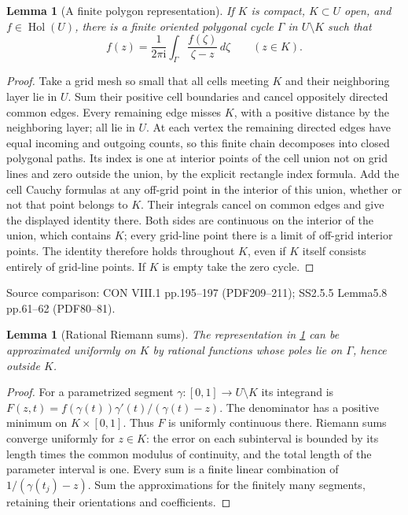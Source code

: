 \documentclass[11pt,a4paper,openany]{book}
\newtheorem{lemma}[theorem]{Lemma}
\theoremstyle{definition}
\theoremstyle{remark}\newtheorem{remark}[theorem]{Remark}
\newcommand{\dd}{\,d}\newcommand{\iu}{\mathrm i}
\DeclareMathOperator{\Hol}{Hol}\DeclareMathOperator{\Mer}{Mer}
\newcommand{\family}[1]{}
\newcommand{\source}[1]{\par\begingroup\small\sffamily\color{black!65}Source comparison: #1\par\endgroup}
\begin{document}
\begin{lemma}[A finite polygon representation]\family{D12.15.02}\label{d12:15-02}
If $K$ is compact, $K\subset U$ open, and $f\in\Hol(U)$, there is a finite oriented polygonal cycle $\Gamma$ in $U\setminus K$ such that
\[
 f(z)=\frac1{2\pi\iu}\int_\Gamma\frac{f(\zeta)}{\zeta-z}\dd\zeta\qquad(z\in K).
\]
\end{lemma}
\begin{proof}
Take a grid mesh so small that all cells meeting $K$ and their neighboring layer lie in $U$. Sum their positive cell boundaries and cancel oppositely directed common edges. Every remaining edge misses $K$, with a positive distance by the neighboring layer; all lie in $U$. At each vertex the remaining directed edges have equal incoming and outgoing counts, so this finite chain decomposes into closed polygonal paths. Its index is one at interior points of the cell union not on grid lines and zero outside the union, by the explicit rectangle index formula. Add the cell Cauchy formulas at any off-grid point in the interior of this union, whether or not that point belongs to $K$. Their integrals cancel on common edges and give the displayed identity there. Both sides are continuous on the interior of the union, which contains $K$; every grid-line point there is a limit of off-grid interior points. The identity therefore holds throughout $K$, even if $K$ itself consists entirely of grid-line points. If $K$ is empty take the zero cycle.
\end{proof}
\source{CON VIII.1 pp.195--197 (PDF209--211); SS2.5.5 Lemma5.8 pp.61--62 (PDF80--81).}

\begin{lemma}[Rational Riemann sums]\family{D12.15.03}\label{d12:15-03}
The representation in \cref{d12:15-02} can be approximated uniformly on $K$ by rational functions whose poles lie on $\Gamma$, hence outside $K$.
\end{lemma}
\begin{proof}
For a parametrized segment $\gamma:[0,1]\to U\setminus K$ its integrand is $F(z,t)=f(\gamma(t))\gamma'(t)/(\gamma(t)-z)$. The denominator has a positive minimum on $K\times[0,1]$. Thus $F$ is uniformly continuous there. Riemann sums converge uniformly for $z\in K$: the error on each subinterval is bounded by its length times the common modulus of continuity, and the total length of the parameter interval is one. Every sum is a finite linear combination of $1/(\gamma(t_j)-z)$. Sum the approximations for the finitely many segments, retaining their orientations and coefficients.
\end{proof}
\end{document}
